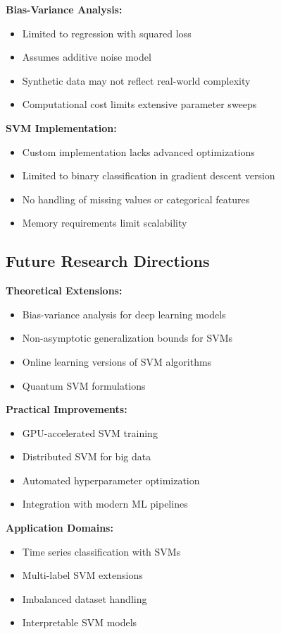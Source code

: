 \documentclass[12pt, a4paper]{article}
\begin{document}
\textbf{Bias-Variance Analysis:}
\begin{itemize}
\item Limited to regression with squared loss
\item Assumes additive noise model
\item Synthetic data may not reflect real-world complexity
\item Computational cost limits extensive parameter sweeps
\end{itemize}

\textbf{SVM Implementation:}
\begin{itemize}
\item Custom implementation lacks advanced optimizations
\item Limited to binary classification in gradient descent version
\item No handling of missing values or categorical features
\item Memory requirements limit scalability
\end{itemize}

\subsection{Future Research Directions}

\textbf{Theoretical Extensions:}
\begin{itemize}
\item Bias-variance analysis for deep learning models
\item Non-asymptotic generalization bounds for SVMs
\item Online learning versions of SVM algorithms
\item Quantum SVM formulations
\end{itemize}

\textbf{Practical Improvements:}
\begin{itemize}
\item GPU-accelerated SVM training
\item Distributed SVM for big data
\item Automated hyperparameter optimization
\item Integration with modern ML pipelines
\end{itemize}

\textbf{Application Domains:}
\begin{itemize}
\item Time series classification with SVMs
\item Multi-label SVM extensions
\item Imbalanced dataset handling
\item Interpretable SVM models
\end{itemize}
\end{document}
